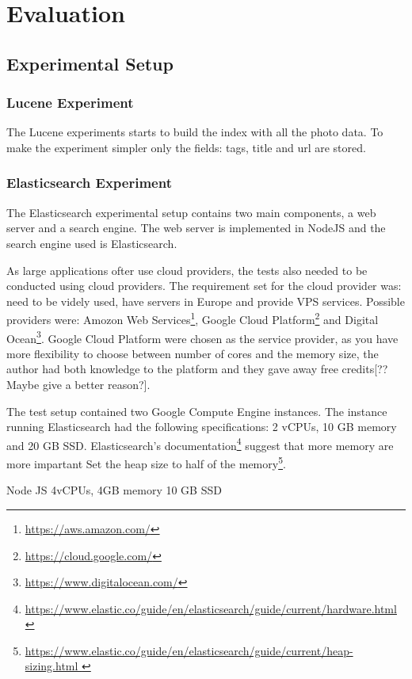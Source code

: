 \chapter{Evaluation}
\label{ch:evaluation}

\section{Experimental Setup}

\subsection{Lucene Experiment}
The Lucene experiments starts to build the index with all the photo data.
To make the experiment simpler only the fields: tags, title and url are stored.

\subsection{Elasticsearch Experiment}
The Elasticsearch experimental setup contains two main components, a web server and a search engine.
The web server is implemented in NodeJS and the search engine used is Elasticsearch.

As large applications ofter use cloud providers, the tests also needed to be conducted using cloud providers.
The requirement set for the cloud provider was: need to be videly used, have servers in Europe and provide VPS services.
Possible providers were: Amozon Web Services\footnote{\url{https://aws.amazon.com/}},
Google Cloud Platform\footnote{\url{https://cloud.google.com/}} and Digital Ocean\footnote{\url{https://www.digitalocean.com/}}.
Google Cloud Platform were chosen as the service provider, as you have more flexibility to choose between number of cores and the memory size,
the author had both knowledge to the platform and they gave away free credits[?? Maybe give a better reason?].

The test setup contained two Google Compute Engine instances.
The instance running Elasticsearch had the following specifications: 2 vCPUs, 10 GB memory and 20 GB SSD.
Elasticsearch's documentation\footnote{\url{https://www.elastic.co/guide/en/elasticsearch/guide/current/hardware.html}} suggest that more memory are more impartant
Set the heap size to half of the memory\footnote{\url{https://www.elastic.co/guide/en/elasticsearch/guide/current/heap-sizing.html  }}.

Node JS
4vCPUs, 4GB memory
10 GB SSD

